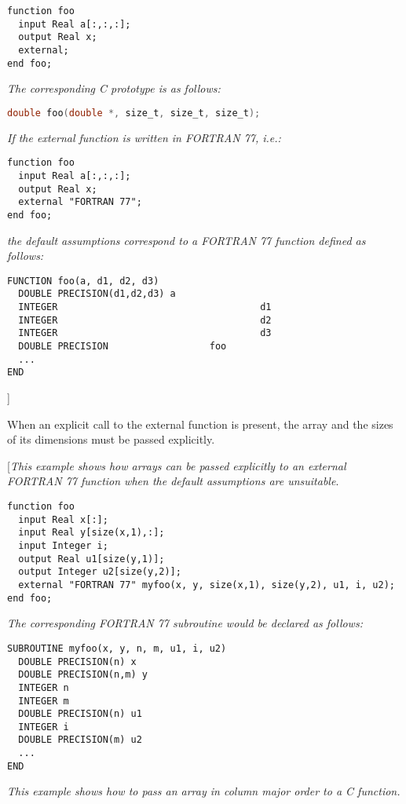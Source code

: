 \begin{lstlisting}[language=modelica]
function foo
  input Real a[:,:,:];
  output Real x;
  external;
end foo;
\end{lstlisting}
\emph{The corresponding C prototype is as follows:}
\begin{lstlisting}[language=C]
double foo(double *, size_t, size_t, size_t);
\end{lstlisting}

\emph{If the external function is written in FORTRAN 77, i.e.:}

\begin{lstlisting}[language=modelica]
function foo
  input Real a[:,:,:];
  output Real x;
  external "FORTRAN 77";
end foo;
\end{lstlisting}
\emph{the default assumptions correspond to a FORTRAN 77 function
defined as follows:}
\begin{lstlisting}[language=fortran77]
FUNCTION foo(a, d1, d2, d3)
  DOUBLE PRECISION(d1,d2,d3) a
  INTEGER                                    d1
  INTEGER                                    d2
  INTEGER                                    d3
  DOUBLE PRECISION                  foo
  ...
END
\end{lstlisting}
{]}

When an explicit call to the external function is present, the array and
the sizes of its dimensions must be passed explicitly.

{[}\emph{This example shows how arrays can be passed explicitly to an
external FORTRAN 77 function when the default assumptions are
unsuitable}.

\begin{lstlisting}[language=modelica]
function foo
  input Real x[:];
  input Real y[size(x,1),:];
  input Integer i;
  output Real u1[size(y,1)];
  output Integer u2[size(y,2)];
  external "FORTRAN 77" myfoo(x, y, size(x,1), size(y,2), u1, i, u2);
end foo;
\end{lstlisting}
\emph{The corresponding FORTRAN 77 subroutine would be declared as
follows: }
\begin{lstlisting}[language=fortran77]
SUBROUTINE myfoo(x, y, n, m, u1, i, u2)
  DOUBLE PRECISION(n) x
  DOUBLE PRECISION(n,m) y
  INTEGER n
  INTEGER m
  DOUBLE PRECISION(n) u1
  INTEGER i
  DOUBLE PRECISION(m) u2
  ...
END
\end{lstlisting}

\emph{This example shows how to pass an array in column major order to a
C function.}

